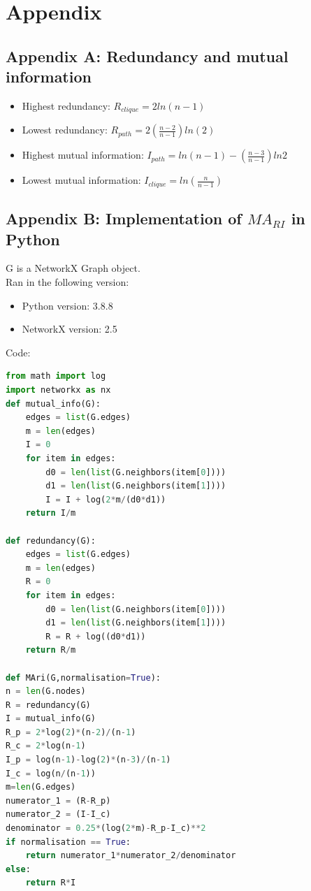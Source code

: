 \documentclass[12pt]{article}
\begin{document}
\section{Appendix}
\subsection{Appendix A: Redundancy and mutual information\cite{KIM20082637}}
\label{appendixa}
\begin{itemize}
    \item Highest redundancy: $R_{clique} = 2ln(n-1)$
    \item Lowest redundancy: $R_{path} = 2(\frac{n-2}{n-1})ln(2)$
    \item Highest mutual information: $I_{path} = ln(n-1)-(\frac{n-3}{n-1})ln2$
    \item Lowest mutual information: $I_{clique}=ln(\frac{n}{n-1})$
\end{itemize}
\subsection{Appendix B: Implementation of $MA_{RI}$ in Python}
\label{maricode}
G is a NetworkX Graph object.\\
Ran in the following version:
\begin{itemize}
    \item Python version: 3.8.8
    \item NetworkX version: 2.5
\end{itemize}
Code:

\begin{lstlisting}[language=Python]
from math import log
import networkx as nx
def mutual_info(G):
    edges = list(G.edges)
    m = len(edges)
    I = 0
    for item in edges:
        d0 = len(list(G.neighbors(item[0])))
        d1 = len(list(G.neighbors(item[1]))) 
        I = I + log(2*m/(d0*d1))
    return I/m

def redundancy(G):
    edges = list(G.edges)
    m = len(edges)
    R = 0
    for item in edges:
        d0 = len(list(G.neighbors(item[0])))
        d1 = len(list(G.neighbors(item[1]))) 
        R = R + log((d0*d1))
    return R/m

def MAri(G,normalisation=True):
n = len(G.nodes)
R = redundancy(G)
I = mutual_info(G)
R_p = 2*log(2)*(n-2)/(n-1)
R_c = 2*log(n-1)
I_p = log(n-1)-log(2)*(n-3)/(n-1)
I_c = log(n/(n-1))
m=len(G.edges)
numerator_1 = (R-R_p)
numerator_2 = (I-I_c)
denominator = 0.25*(log(2*m)-R_p-I_c)**2
if normalisation == True:
    return numerator_1*numerator_2/denominator
else:
    return R*I
\end{lstlisting}
\printbibliography
\end{document}
